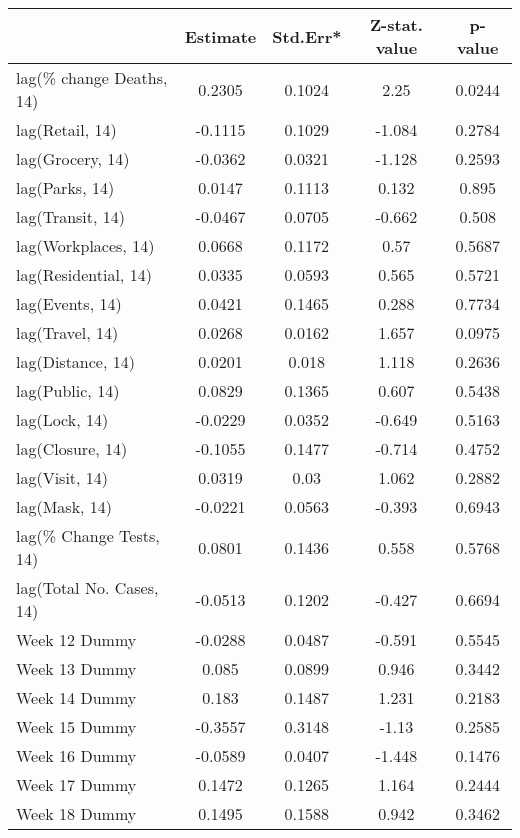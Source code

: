 \begingroup\tiny
\begin{longtable}{lcccc}
  \toprule
 & Estimate & Std.Err* & Z-stat. value & p-value \\ 
  \midrule
lag(\% change Deaths, 14) & 0.2305 & 0.1024 & 2.25 & 0.0244 \\ 
  lag(Retail, 14) & -0.1115 & 0.1029 & -1.084 & 0.2784 \\ 
  lag(Grocery, 14) & -0.0362 & 0.0321 & -1.128 & 0.2593 \\ 
  lag(Parks, 14) & 0.0147 & 0.1113 & 0.132 & 0.895 \\ 
  lag(Transit, 14) & -0.0467 & 0.0705 & -0.662 & 0.508 \\ 
  lag(Workplaces, 14) & 0.0668 & 0.1172 & 0.57 & 0.5687 \\ 
  lag(Residential, 14) & 0.0335 & 0.0593 & 0.565 & 0.5721 \\ 
  lag(Events, 14) & 0.0421 & 0.1465 & 0.288 & 0.7734 \\ 
  lag(Travel, 14) & 0.0268 & 0.0162 & 1.657 & 0.0975 \\ 
  lag(Distance, 14) & 0.0201 & 0.018 & 1.118 & 0.2636 \\ 
  lag(Public, 14) & 0.0829 & 0.1365 & 0.607 & 0.5438 \\ 
  lag(Lock, 14) & -0.0229 & 0.0352 & -0.649 & 0.5163 \\ 
  lag(Closure, 14) & -0.1055 & 0.1477 & -0.714 & 0.4752 \\ 
  lag(Visit, 14) & 0.0319 & 0.03 & 1.062 & 0.2882 \\ 
  lag(Mask, 14) & -0.0221 & 0.0563 & -0.393 & 0.6943 \\ 
  lag(\% Change Tests, 14) & 0.0801 & 0.1436 & 0.558 & 0.5768 \\ 
  lag(Total No. Cases, 14) & -0.0513 & 0.1202 & -0.427 & 0.6694 \\ 
  Week 12 Dummy & -0.0288 & 0.0487 & -0.591 & 0.5545 \\ 
  Week 13 Dummy & 0.085 & 0.0899 & 0.946 & 0.3442 \\ 
  Week 14 Dummy & 0.183 & 0.1487 & 1.231 & 0.2183 \\ 
  Week 15 Dummy & -0.3557 & 0.3148 & -1.13 & 0.2585 \\ 
  Week 16 Dummy & -0.0589 & 0.0407 & -1.448 & 0.1476 \\ 
  Week 17 Dummy & 0.1472 & 0.1265 & 1.164 & 0.2444 \\ 
  Week 18 Dummy & 0.1495 & 0.1588 & 0.942 & 0.3462 \\ 

\end{longtable}
